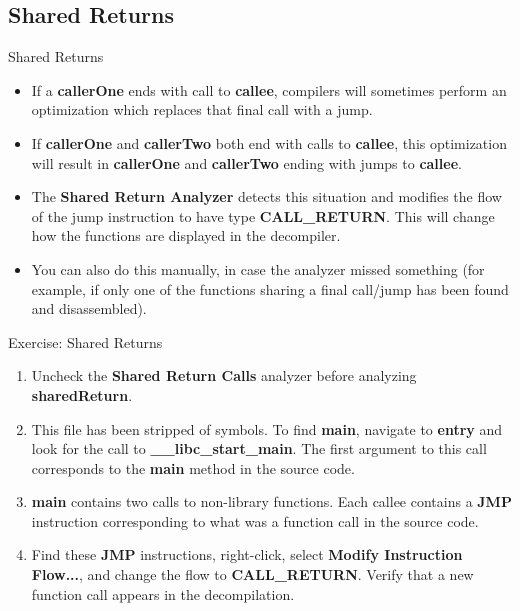 \documentclass{beamer}
\begin{document}
\subsection{Shared Returns}
\begin{frame}
\begin{block}{Shared Returns}
\begin{itemize}
\item If a \textbf{callerOne} ends with call to \textbf{callee}, compilers will sometimes perform an optimization which replaces that final call with a jump.
\item If \textbf{callerOne} and \textbf{callerTwo} both end with calls to \textbf{callee}, this optimization will result in \textbf{callerOne} and \textbf{callerTwo}
ending with jumps to \textbf{callee}.
\item The \textbf{Shared Return Analyzer} detects this situation and modifies the flow of the jump instruction to have type \textbf{CALL\_RETURN}. This will change how
the functions are displayed in the decompiler.
\item You can also do this manually, in case the analyzer missed something (for example, if only one of the functions sharing a final call/jump has been found and disassembled).
\end{itemize}
\end{block}
\end{frame}

\begin{frame}
\begin{block}{Exercise: Shared Returns}
\begin{enumerate}
\item Uncheck the \textbf{Shared Return Calls} analyzer before analyzing \textbf{sharedReturn}.
\item This file has been stripped of symbols.  To find \textbf{main}, navigate to \textbf{entry} and look for the call to \textbf{\_\_libc\_start\_main}. The first argument to this
call corresponds to the \textbf{main} method in the source code.
\item \textbf{main} contains two calls to non-library functions.  Each callee contains a \textbf{JMP} instruction corresponding to what was a function call in the source code.
\item Find these \textbf{JMP} instructions, right-click, select \textbf{Modify Instruction Flow...}, and change the flow to \textbf{CALL\_RETURN}. Verify that a new function call appears
in the decompilation.
\end{enumerate}
\end{block}
\end{frame}
\end{document}
